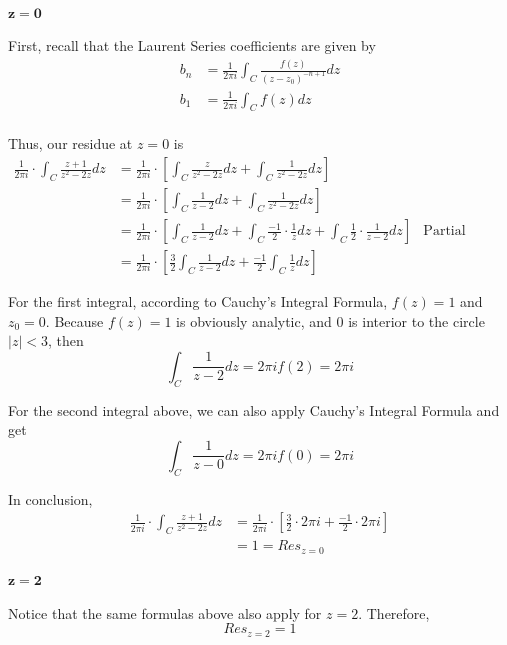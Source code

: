 \documentclass[11pt]{article}
\begin{document}
\begin{enumerate}
\begin{enumerate}
		\paragraph{$\mathbf{z = 0}$}
		First, recall that the Laurent Series coefficients are given by 
		\[\begin{aligned}
		b_n &= \frac{1}{2\pi i} \int_C \frac{f(z)}{(z - z_0)^{-n + 1}} dz \\
		b_1 &= \frac{1}{2\pi i} \int_C f(z) dz \\
		\end{aligned}\]
		
		Thus, our residue at $z = 0$ is
		\[\begin{aligned}
		\frac{1}{2\pi i} \cdot \int_C \frac{z + 1}{z^2 - 2z} dz &=
		\frac{1}{2\pi i} \cdot [\int_C \frac{z}{z^2 - 2z} dz +
			\int_C \frac{1}{z^2 - 2z} dz] \\
		&= \frac{1}{2\pi i} \cdot [\int_C \frac{1}{z - 2} dz +
		\int_C \frac{1}{z^2 - 2z} dz] \\
		&= \frac{1}{2\pi i} \cdot [\int_C \frac{1}{z - 2} dz +
		\int_C \frac{-1}{2} \cdot \frac{1}{z} dz +
		\int_C \frac{1}{2} \cdot \frac{1}{z - 2} dz ] & \text{Partial fractions} \\
		&= \frac{1}{2\pi i} \cdot
		[\frac{3}{2} \int_C \frac{1}{z - 2} dz +
         \frac{-1}{2} \int_C \frac{1}{z} dz ]
		\end{aligned}\]
		
		For the first integral, according to Cauchy's Integral Formula, $f(z) = 1$ and $z_0 = 0$. Because $f(z) = 1$ is obviously analytic, and $0$ is interior to the circle $|z| < 3$, then 
		\[\int_C \frac{1}{z - 2} dz = 2\pi i f(2) = 2\pi i\]
		
		For the second integral above, we can also apply Cauchy's Integral Formula and get
		\[\int_C \frac{1}{z - 0} dz = 2\pi i f(0) = 2\pi i \]	
		
		In conclusion,
		\[\begin{aligned}
		\frac{1}{2\pi i} \cdot \int_C \frac{z + 1}{z^2 - 2z} dz
		&= \frac{1}{2\pi i} \cdot [\frac{3}{2} \cdot 2\pi i + \frac{-1}{2} \cdot 2\pi i] \\
		&= 1 = Res_{z = 0}
		\end{aligned}\]

		\paragraph{$\mathbf{z = 2}$}
		Notice that the same formulas above also apply for $z = 2$. Therefore, 
		\[Res_{z = 2} = 1\]
		

\end{enumerate}
\end{enumerate}
\end{document}
